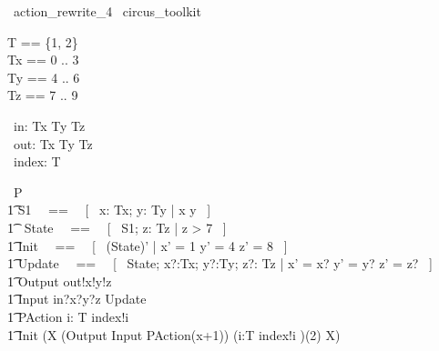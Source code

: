 % 
\begin{zsection}
  \SECTION\ action\_rewrite\_4 \parents\ circus\_toolkit
\end{zsection}

\begin{zed}
    T == \{1, 2\} \\
	Tx == 0 .. 3 \\ 
	Ty == 4 .. 6 \\ 
	Tz == 7 .. 9 \\ 
\end{zed}

\begin{circus}
	\circchannel\ in: Tx \cross Ty \cross Tz \\
	\circchannel\ out: Tx \cross Ty \cross Tz \\
	\circchannel\ index: T \\
\end{circus}

\begin{circus}
    \circprocess\ P \circdef \circbegin \\
        \t1 S1 ~~==~~ [~  x: Tx; y: Ty | x  \land y  ~] \\
        \t1 \circstate\ State ~~==~~ [~ S1; z: Tz | z > 7 ~] \\
        \t1 Init ~~==~~ [~ (State)' | x' = 1 \land y' = 4 \land z' = 8 ~] \\
        \t1 Update ~~==~~ [~ \Delta State; x?:Tx; y?:Ty; z?: Tz | x' = x? \land y' = y? \land z' = z? ~] \\
        \t1 Output \circdef out!x!y!z \then \Skip \\
        \t1 Input \circdef in?x?y?z \then \lschexpract Update \rschexpract \\
        \t1 PAction \circdef i: T \circspot index!i \then \Skip \\
        \t1 \circspot \lschexpract Init \rschexpract \circseq (\circmu X \circspot (Output \extchoice Input \intchoice PAction(x+1)) \circseq (i:T \circspot index!i \then \Skip)(2) \circseq X) \\ 
	\circend
\end{circus}

